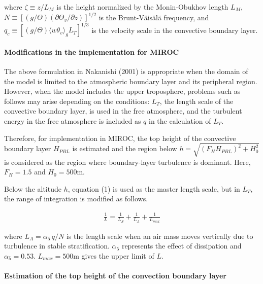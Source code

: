 where \(\zeta\equiv z/L_M\) is the height normalized by the
Monin-Obukhov length \(L_M\),
\(N\equiv\left[(g/\Theta)(\partial\Theta_v/\partial z)\right]^{1/2}\) is
the Brunt-Väisälä frequency, and
\(q_c\equiv [(g/\Theta)\langle w\theta_v \rangle_gL_T]^{1/3}\) is the
velocity scale in the convective boundary layer.

\hypertarget{modifications-in-the-implementation-for-miroc}{%
\paragraph{Modifications in the implementation for
MIROC}\label{modifications-in-the-implementation-for-miroc}}

The above formulation in Nakanishi (2001) is appropriate when the domain
of the model is limited to the atmospheric boundary layer and its
peripheral region. However, when the model includes the upper
troposphere, problems such as follows may arise depending on the
conditions: \(L_T\), the length scale of the convective boundary layer,
is used in the free atmosphere, and the turbulent energy in the free
atmosphere is included as \(q\) in the calculation of \(L_T\).

Therefore, for implementation in MIROC, the top height of the convective
boundary layer \(H_{PBL}\) is estimated and the region below
\(h=\sqrt{(F_H H_{PBL})^2+H_0^2}\) is considered as the region where
boundary-layer turbulence is dominant. Here, \(F_H=1.5\) and
\(H_0=500\)m.

Below the altitude \(h\), equation (1) is used as the master length
scale, but in \(L_T\), the range of integration is modified as follows.

\begin{eqnarray}\frac{1}{L}=\frac{1}{L_S}+\frac{1}{L_A}+\frac{1}{L_{max}}\end{eqnarray}

where \(L_A=\alpha_5\,q/N\) is the length scale when an air mass moves
vertically due to turbulence in stable stratification. \(\alpha_5\)
represents the effect of dissipation and \(\alpha_5=0.53\).
\(L_{max}=500\)m gives the upper limit of \(L\).

\hypertarget{estimation-of-the-top-height-of-the-convection-boundary-layer}{%
\paragraph{Estimation of the top height of the convection boundary
layer}\label{estimation-of-the-top-height-of-the-convection-boundary-layer}}

